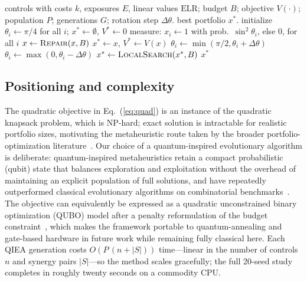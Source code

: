 \documentclass[preprint,12pt]{elsarticle}
\begin{document}
\begin{algorithm}
\caption{Quantum-Inspired Evolutionary Algorithm (QIEA) for synergy-aware control selection.}
\label{alg:qiea}
\begin{algorithmic}[1]
\Require controls with costs $k$, exposures $E$, linear values $\mathrm{ELR}$; budget $B$;
objective $V(\cdot)$; population $P$; generations $G$; rotation step $\Delta\theta$.
\Ensure best portfolio $x^\ast$.
\State initialize $\theta_i \gets \pi/4$ for all $i$; $x^\ast \gets \emptyset$, $V^\ast \gets 0$
    \State measure: $x_i \gets 1$ with prob.\ $\sin^2\theta_i$, else 0, for all $i$
    \State $x \gets \textsc{Repair}(x, B)$ 
     $x^\ast \gets x$, $V^\ast \gets V(x)$ \EndIf
  \EndFor
   
     $\theta_i \gets \min(\pi/2, \theta_i + \Delta\theta)$
    \Else{} $\theta_i \gets \max(0, \theta_i - \Delta\theta)$ \EndIf
  \EndFor
\EndFor
\State $x^\ast \gets \textsc{LocalSearch}(x^\ast, B)$ 
\State \Return $x^\ast$
\end{algorithmic}
\end{algorithm}

\subsection{Positioning and complexity}
\label{sec:complexity}
The quadratic objective in Eq.~(\ref{eq:quad}) is an instance of the quadratic knapsack
problem, which is NP-hard; exact solution is intractable for realistic portfolio sizes,
motivating the metaheuristic route taken by the broader portfolio-optimization
literature~\cite{gupta2023}. Our choice of a quantum-inspired evolutionary algorithm is
deliberate: quantum-inspired metaheuristics retain a compact probabilistic (qubit) state
that balances exploration and exploitation without the overhead of maintaining an
explicit population of full solutions, and have repeatedly outperformed classical
evolutionary algorithms on combinatorial benchmarks~\cite{zhang2021,layeb2011,zhang2024,acampora2023}.
The objective can equivalently be expressed as a quadratic unconstrained binary
optimization (QUBO) model after a penalty reformulation of the budget
constraint~\cite{glover2019}, which makes the framework portable to quantum-annealing and
gate-based hardware in future work while remaining fully classical here. Each QIEA
generation costs $O(P\,(n + |S|))$ time---linear in the number of controls $n$ and
synergy pairs $|S|$---so the method scales gracefully; the full 20-seed study completes in
roughly twenty seconds on a commodity CPU.
\end{document}
